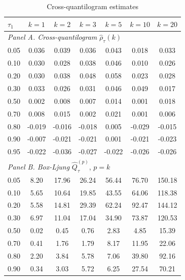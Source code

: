 \begin{table}[htbp]\centering
\caption{Cross-quantilogram estimates}\label{tab:cq}
\begin{tabular}{lcccccc}
\toprule
$\tau_1$ & $k=1$ & $k=2$ & $k=3$ & $k=5$ & $k=10$ & $k=20$ \\
\midrule
\multicolumn{7}{l}{\textit{Panel A. Cross-quantilogram } $\hat\rho_\tau(k)$} \\
0.05 & 0.036\sym{**} & 0.039\sym{***} & 0.036\sym{**} & 0.043\sym{***} & 0.018 & 0.033\sym{**} \\
0.10 & 0.030\sym{**} & 0.028\sym{**} & 0.038\sym{**} & 0.046\sym{***} & 0.010 & 0.026\sym{*} \\
0.20 & 0.030\sym{**} & 0.038\sym{***} & 0.048\sym{***} & 0.058\sym{***} & 0.023\sym{*} & 0.028\sym{*} \\
0.30 & 0.033\sym{**} & 0.026\sym{**} & 0.031\sym{**} & 0.046\sym{***} & 0.049\sym{***} & 0.017 \\
0.50 & 0.002 & 0.008 & 0.007 & 0.014 & 0.001 & 0.018 \\
0.70 & 0.008 & 0.015 & 0.002 & 0.021 & 0.001 & 0.006 \\
0.80 & -0.019 & -0.016 & -0.018 & 0.005 & -0.029\sym{**} & -0.015 \\
0.90 & -0.007 & -0.021 & -0.021 & 0.001 & -0.021 & -0.023 \\
0.95 & -0.022 & -0.036\sym{**} & -0.027\sym{*} & -0.022 & -0.026\sym{*} & -0.026\sym{*} \\
\midrule
\multicolumn{7}{l}{\textit{Panel B. Box-Ljung } $\hat Q^{(p)}_\tau$, $p=k$} \\
0.05 & 8.20\sym{**} & 17.96\sym{***} & 26.24\sym{***} & 56.44\sym{***} & 76.70\sym{***} & 150.18\sym{***} \\
0.10 & 5.65\sym{**} & 10.64\sym{***} & 19.85\sym{***} & 43.55\sym{***} & 64.06\sym{***} & 118.38\sym{***} \\
0.20 & 5.58\sym{**} & 14.81\sym{***} & 29.39\sym{***} & 62.24\sym{***} & 92.47\sym{***} & 144.12\sym{***} \\
0.30 & 6.97\sym{**} & 11.04\sym{**} & 17.04\sym{***} & 34.90\sym{***} & 73.87\sym{***} & 120.53\sym{***} \\
0.50 & 0.02 & 0.45 & 0.76 & 2.83 & 4.85 & 15.39 \\
0.70 & 0.41 & 1.76 & 1.79 & 8.17 & 11.95 & 22.06 \\
0.80 & 2.20 & 3.84 & 5.78 & 7.06 & 39.80\sym{**} & 92.16\sym{***} \\
0.90 & 0.34 & 3.03 & 5.72 & 6.25 & 27.54 & 70.21\sym{**} \\

\end{tabular}
\end{table}
